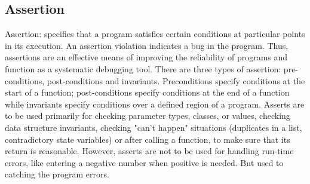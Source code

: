\documentclass{sig-alternate}
\begin{document}
\subsection{Assertion}
Assertion: specifies that a program satisfies certain conditions at particular points in its execution. An assertion violation indicates a bug in the program. Thus, assertions are an effective means of improving the reliability of programs and function as a systematic debugging tool. There are three types of assertion: pre-conditions, post-conditions and invariants. Preconditions specify conditions at the start of a function; post-conditions specify conditions at the end of a function while invariants specify conditions over a defined region of a program. Asserts are to be used primarily for checking parameter types, classes, or values, checking data structure invariants, checking "can't happen" situations (duplicates in a list, contradictory state variables) or after calling a function, to make sure that its return is reasonable. However, asserts are not to be used for handling run-time errors, like entering a negative number when positive is needed. But used to catching the program errors.
\end{document}
